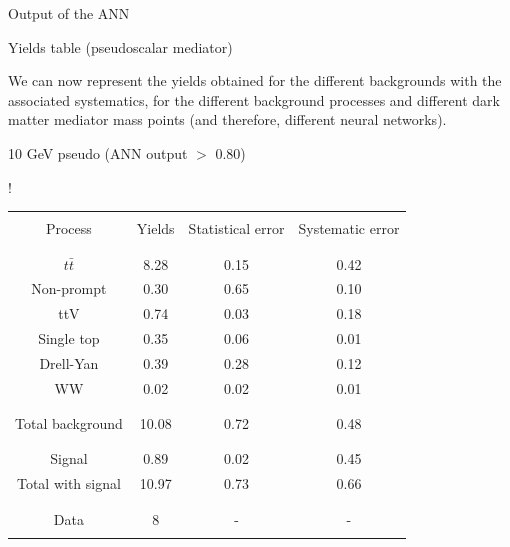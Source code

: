 \documentclass[handout,8 pt]{beamer}
\begin{document}
\begin{frame}{Output of the ANN}
\begin{minipage}[c]{.48\linewidth}
{	}
   \end{minipage} \hfill \vfill

\end{frame}


\begin{frame}{Yields table (pseudoscalar mediator)}

	\justifying 
	We can now represent the yields obtained for the different backgrounds with the associated systematics, for the different background processes and different dark matter mediator mass points (and therefore, different neural networks). \vfill
	
	\begin{minipage}[c]{.48\linewidth}
	
	\begin{center}
	
	\begin{exampleblock}{}{ \begin{center} 10 GeV pseudo (ANN output $>$ 0.80) \end{center}} \end{exampleblock} \vspace{8pt}
	
	\resizebox{170pt} {!}{
	\begin{tabular}{c|c|c|c}
	 	& & & \\
		Process & Yields & Statistical error & Systematic error \\
		& & & \\
		\hline \hline
		& & & \\
		$t \bar t$ & 8.28 & 0.15 & 0.42 \\
		Non-prompt & 0.30 & 0.65 & 0.10 \\
		ttV & 0.74 & 0.03 & 0.18 \\
		Single top & 0.35 & 0.06 & 0.01 \\
		Drell-Yan & 0.39 & 0.28 & 0.12 \\
		WW & 0.02 & 0.02 & 0.01 \\
		& & & \\
		\hline
		& & & \\
		Total background & 10.08 & 0.72 & 0.48 \\
		& & & \\
		\hline
		& & & \\
		Signal & 0.89 & 0.02 & 0.45 \\
		Total with signal & 10.97 & 0.73 & 0.66 \\
		& & & \\
		\hline
		& & & \\
		Data & 8 & - & - \\
		& & & \\
	\end{tabular}
	} 
	

\end{center}
\end{minipage}
\end{frame}
\end{document}
